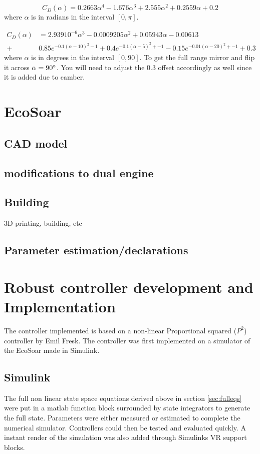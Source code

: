 \documentclass{article}
\begin{document}
\begin{equation}
C_D(\alpha) = 0.2663 \alpha^4 -1.676 \alpha^3 + 2.555 \alpha^2 + 0.2559 \alpha + 0.2%
\end{equation}
where $\alpha$ is in radians in the interval $[0,\pi]$.

\begin{equation}\begin{split}
    C_D(\alpha) &= 2.939 10^{-6} \alpha^3 -0.0009205 \alpha^2 + 0.05943 \alpha -0.00613 \\
    +&
    0.85 e^{ -0.1 (\alpha - 10)^2 - 1 } + 0.4 e^{ -0.1 (\alpha - 5)^2 + -1 } - 0.15 e^{ -0.01 (\alpha - 20)^2 + -1 }
    + 0.3
\end{split}\end{equation}
where $\alpha$ is in degrees in the interval $[0,90]$.
To get the full range mirror and flip it across $\alpha = 90 \degree$.
You will need to adjust the $0.3$ offset accordingly as well since it is added due to camber.


\section{EcoSoar}
\subsection{CAD model}
\subsection{modifications to dual engine}
\subsection{Building}
3D printing, building, etc
\subsection{Parameter estimation/declarations}

\section{\textbf{Robust controller development and Implementation}}
The controller implemented is based on a non-linear Proportional squared ($P^2$) controller by Emil Fresk\cite{P2}.
The controller was first implemented on a simulator of the EcoSoar made in Simulink.
\subsection{Simulink}
The full non linear state space equations derived above in section \ref{sec:fulleqs} were put in a matlab function block surrounded by state integrators to generate the full state.
Parameters were either measured or estimated to complete the numerical simulator.
Controllers could then be tested and evaluated quickly.
A instant render of the simulation was also added through Simulinks VR support blocks.
\end{document}
